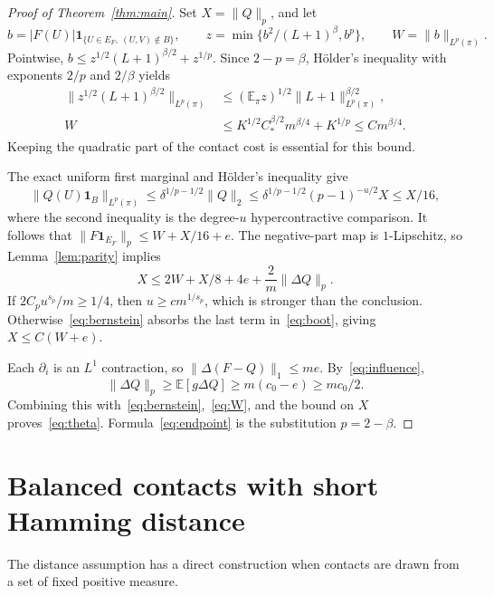 \documentclass[11pt]{article}
\theoremstyle{remark}\newtheorem{remark}[theorem]{Remark}
\newcommand{\E}{\mathbb E}\newcommand{\Prb}{\mathbb P}
\newcommand{\1}{\mathbf 1}\newcommand{\norm}[2]{\lVert #1\rVert_{#2}}
\begin{document}
\begin{proof}[Proof of Theorem~\ref{thm:main}]
Set $X=\norm Qp$, and let
\[
 b=|F(U)|\mathbf1_{\{U\in E_F,\ (U,V)\notin B\}},\qquad
 z=\min\{b^2/(L+1)^\beta,b^p\},\qquad W=\norm b{L^p(\pi)}.
\]
Pointwise,
$b\le z^{1/2}(L+1)^{\beta/2}+z^{1/p}$.
Since $2-p=\beta$, H\"older's inequality with exponents $2/p$ and $2/\beta$ yields
\begin{align}
 \norm{z^{1/2}(L+1)^{\beta/2}}{L^p(\pi)}
 &\le(\E_\pi z)^{1/2}\norm{L+1}{L^p(\pi)}^{\beta/2},\label{eq:holder}\\
 W&\le K^{1/2}C_*^{\beta/2}m^{\beta/4}+K^{1/p}
 \le C m^{\beta/4}.\label{eq:W}
\end{align}
Keeping the quadratic part of the contact cost is essential for this bound.

The exact uniform first marginal and H\"older's inequality give
\[
 \norm{Q(U)\mathbf1_B}{L^p(\pi)}
 \le\delta^{1/p-1/2}\norm Q2
 \le\delta^{1/p-1/2}(p-1)^{-u/2}X\le X/16,
\]
where the second inequality is the degree-$u$ hypercontractive comparison.
It follows that
$\norm{F\mathbf1_{E_F}}p\le W+X/16+e$.
The negative-part map is $1$-Lipschitz, so Lemma~\ref{lem:parity} implies
\begin{equation}\label{eq:boot}
 X\le2W+X/8+4e+\frac2m\norm{\Delta Q}p.
\end{equation}
If $2C_pu^{s_p}/m\ge1/4$, then $u\ge c m^{1/s_p}$, which is stronger than the conclusion. Otherwise~\eqref{eq:bernstein} absorbs the last term in~\eqref{eq:boot}, giving $X\le C(W+e)$.

Each $\partial_i$ is an $L^1$ contraction, so
$\norm{\Delta(F-Q)}1\le me$. By~\eqref{eq:influence},
\[
 \norm{\Delta Q}p\ge\E[g\Delta Q]\ge m(c_0-e)\ge mc_0/2.
\]
Combining this with~\eqref{eq:bernstein},~\eqref{eq:W}, and the bound on $X$ proves~\eqref{eq:theta}. Formula~\eqref{eq:endpoint} is the substitution $p=2-\beta$.
\end{proof}

\section{Balanced contacts with short Hamming distance}
The distance assumption has a direct construction when contacts are drawn from a set of fixed positive measure.
\end{document}
